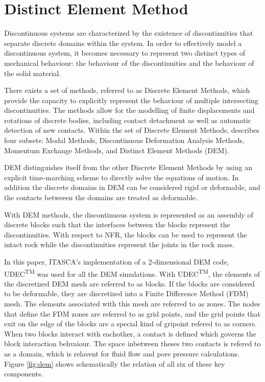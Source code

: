 \section{Distinct Element Method}
Discontinuous systems are characterized by the existence of discontinuities that separate discrete domains within the system. In order to effectively model a discontinuous system, it becomes necessary to represent two distinct types of mechanical behaviour: the behaviour of the discontinuities and the behaviour of the solid material.

There exists a set of methods, referred to as Discrete Element Methods, which provide the capacity to explicitly represent the behaviour of multiple intersecting discontinuities. The methods allow for the modelling of finite displacements and rotations of discrete bodies, including contact detachment as well as automatic detection of new contacts. Within the set of Discrete Element Methods, \citet{CUNDALL_1992} describes four subsets: Modal Methods, Discontinuous Deformation Analysis Methods, Momentum Exchange Methods, and Distinct Element Methods (DEM).

DEM distinguishes itself from the other Discrete Element Methods by using an explicit time-marching scheme to directly solve the equations of motion. In addition the discrete domains in DEM can be considered rigid or deformable, and the contacts betweeen the domains are treated as deformable.  


With DEM methods, the discontinuous system is represented as an assembly of discrete blocks such that the interfaces between the blocks represent the discontinuities. With respect to NFR, the blocks can be used to represent the intact rock while the discontinuities represent the joints in the rock mass.  

In this paper, ITASCA's implementation of a 2-dimensional DEM code, UDEC\textsuperscript{TM} was used for all the DEM simulations. With UDEC\textsuperscript{TM}, the elements of the discretized DEM mesh are referred to as blocks. If the blocks are considered to be deformable, they are discretized into a Finite Difference Method (FDM) mesh. The elements associated with this mesh are referred to as zones. The nodes that define the FDM zones are referred to as grid points, and the grid points that exit on the edge of the blocks are a special kind of gripoint refered to as corners. When two blocks interact with eachother, a contact is defined which governs the block interaction behvaiour. The space inbetween theses two contacts is refered to as a domain, which is relavent for fluid flow and pore pressure calculations. Figure \ref{fig:dem} shows schematically the relation of all six of these key components. 